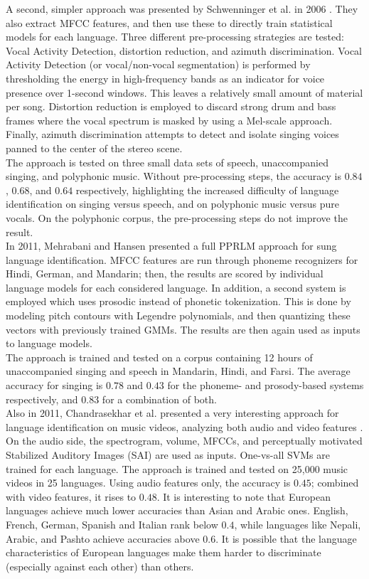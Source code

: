A second, simpler approach was presented by Schwenninger et al. in 2006 \cite{schwenninger}. They also extract MFCC features, and then use these to directly train statistical models for each language. Three different pre-processing strategies are tested: Vocal Activity Detection, distortion reduction, and azimuth discrimination. Vocal Activity Detection (or vocal/non-vocal segmentation) is performed by thresholding the energy in high-frequency bands as an indicator for voice presence over 1-second windows. This leaves a relatively small amount of material per song. Distortion reduction is employed to discard strong drum and bass frames where the vocal spectrum is masked by using a Mel-scale approach. Finally, azimuth discrimination attempts to detect and isolate singing voices panned to the center of the stereo scene.\\
The approach is tested on three small data sets of speech, unaccompanied singing, and polyphonic music. Without pre-processing steps, the accuracy is $0.84$, $0.68$, and $0.64$ respectively, highlighting the increased difficulty of language identification on singing versus speech, and on polyphonic music versus pure vocals. On the polyphonic corpus, the pre-processing steps do not improve the result.\\

In 2011, Mehrabani and Hansen presented a full PPRLM approach for sung language identification. MFCC features are run through phoneme recognizers for Hindi, German, and Mandarin; then, the results are scored by individual language models for each considered language. In addition, a second system is employed which uses prosodic instead of phonetic tokenization. This is done by modeling pitch contours with Legendre polynomials, and then quantizing these vectors with previously trained GMMs. The results are then again used as inputs to language models.\\
The approach is trained and tested on a corpus containing 12 hours of unaccompanied singing and speech in Mandarin, Hindi, and Farsi. The average accuracy for singing is $0.78$ and $0.43$ for the phoneme- and prosody-based systems respectively, and $0.83$ for a combination of both.\\

Also in 2011, Chandrasekhar et al. presented a very interesting approach for language identification on music videos, analyzing both audio and video features \cite {chandrasekhar}. On the audio side, the spectrogram, volume, MFCCs, and perceptually motivated Stabilized Auditory Images (SAI) are used as inputs. One-vs-all SVMs are trained for each language. The approach is trained and tested on 25,000 music videos in 25 languages. Using audio features only, the accuracy is $0.45$; combined with video features, it rises to $0.48$. It is interesting to note that European languages achieve much lower accuracies than Asian and Arabic ones. English, French, German, Spanish and Italian rank below $0.4$, while languages like Nepali, Arabic, and Pashto achieve accuracies above $0.6$. It is possible that the language characteristics of European languages make them harder to discriminate (especially against each other) than others.

